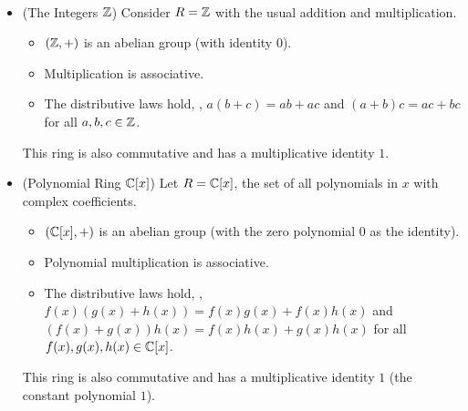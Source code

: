 \documentclass[11pt,openany]{article}
\begin{document}
\begin{example}
\ \begin{itemize}
	\item (The Integers $\mathbb{Z}$) Consider $R=\mathbb{Z}$ with the usual addition and multiplication.
	\begin{itemize}
		\item $(\mathbb{Z},+)$ is an abelian group (with identity $0$).
		\item Multiplication is associative.
		\item The distributive laws hold, \ie, $a(b+c)=ab+ac$ and $(a+b)c=ac+bc$ for all $a,b,c\in\mathbb{Z}$.
	\end{itemize}
	This ring is also commutative and has a multiplicative identity $1$.
	\vspace{20pt}
	\item (Polynomial Ring $\mathbb{C}[x]$) Let $R=\mathbb{C}[x]$, the set of all polynomials in $x$ with complex coefficients. \begin{itemize}
		\item $(\mathbb{C}[x],+)$ is an abelian group (with the zero polynomial $0$ as the identity).
		\item Polynomial multiplication is associative.
		\item The distributive laws hold, \ie, $f(x)(g(x)+h(x))=f(x)g(x)+f(x)h(x)$ and $(f(x)+g(x))h(x)=f(x)h(x)+g(x)h(x)$ for all $f(x),g(x),h(x)\in\mathbb{C}[x]$.
	\end{itemize}
	This ring is also commutative and has a multiplicative identity $1$ (the constant polynomial $1$).
\end{itemize}
\end{example}
\end{document}
